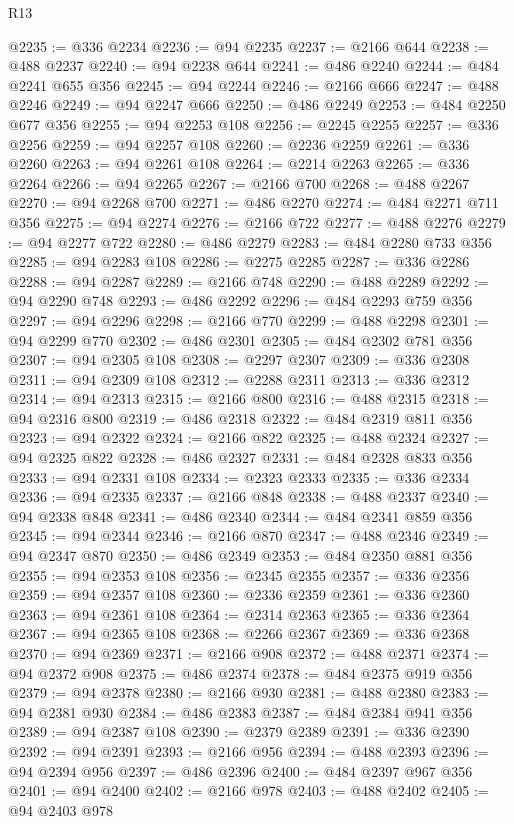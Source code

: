 \begin{lexlean}{R13}
\begin{coremodule}
@2235 := @336 @2234
@2236 := @94 @2235
@2237 := @2166 @644
@2238 := @488 @2237
@2240 := @94 @2238 @644
@2241 := @486 @2240
@2244 := @484 @2241 @655 @356
@2245 := @94 @2244
@2246 := @2166 @666
@2247 := @488 @2246
@2249 := @94 @2247 @666
@2250 := @486 @2249
@2253 := @484 @2250 @677 @356
@2255 := @94 @2253 @108
@2256 := @2245 @2255
@2257 := @336 @2256
@2259 := @94 @2257 @108
@2260 := @2236 @2259
@2261 := @336 @2260
@2263 := @94 @2261 @108
@2264 := @2214 @2263
@2265 := @336 @2264
@2266 := @94 @2265
@2267 := @2166 @700
@2268 := @488 @2267
@2270 := @94 @2268 @700
@2271 := @486 @2270
@2274 := @484 @2271 @711 @356
@2275 := @94 @2274
@2276 := @2166 @722
@2277 := @488 @2276
@2279 := @94 @2277 @722
@2280 := @486 @2279
@2283 := @484 @2280 @733 @356
@2285 := @94 @2283 @108
@2286 := @2275 @2285
@2287 := @336 @2286
@2288 := @94 @2287
@2289 := @2166 @748
@2290 := @488 @2289
@2292 := @94 @2290 @748
@2293 := @486 @2292
@2296 := @484 @2293 @759 @356
@2297 := @94 @2296
@2298 := @2166 @770
@2299 := @488 @2298
@2301 := @94 @2299 @770
@2302 := @486 @2301
@2305 := @484 @2302 @781 @356
@2307 := @94 @2305 @108
@2308 := @2297 @2307
@2309 := @336 @2308
@2311 := @94 @2309 @108
@2312 := @2288 @2311
@2313 := @336 @2312
@2314 := @94 @2313
@2315 := @2166 @800
@2316 := @488 @2315
@2318 := @94 @2316 @800
@2319 := @486 @2318
@2322 := @484 @2319 @811 @356
@2323 := @94 @2322
@2324 := @2166 @822
@2325 := @488 @2324
@2327 := @94 @2325 @822
@2328 := @486 @2327
@2331 := @484 @2328 @833 @356
@2333 := @94 @2331 @108
@2334 := @2323 @2333
@2335 := @336 @2334
@2336 := @94 @2335
@2337 := @2166 @848
@2338 := @488 @2337
@2340 := @94 @2338 @848
@2341 := @486 @2340
@2344 := @484 @2341 @859 @356
@2345 := @94 @2344
@2346 := @2166 @870
@2347 := @488 @2346
@2349 := @94 @2347 @870
@2350 := @486 @2349
@2353 := @484 @2350 @881 @356
@2355 := @94 @2353 @108
@2356 := @2345 @2355
@2357 := @336 @2356
@2359 := @94 @2357 @108
@2360 := @2336 @2359
@2361 := @336 @2360
@2363 := @94 @2361 @108
@2364 := @2314 @2363
@2365 := @336 @2364
@2367 := @94 @2365 @108
@2368 := @2266 @2367
@2369 := @336 @2368
@2370 := @94 @2369
@2371 := @2166 @908
@2372 := @488 @2371
@2374 := @94 @2372 @908
@2375 := @486 @2374
@2378 := @484 @2375 @919 @356
@2379 := @94 @2378
@2380 := @2166 @930
@2381 := @488 @2380
@2383 := @94 @2381 @930
@2384 := @486 @2383
@2387 := @484 @2384 @941 @356
@2389 := @94 @2387 @108
@2390 := @2379 @2389
@2391 := @336 @2390
@2392 := @94 @2391
@2393 := @2166 @956
@2394 := @488 @2393
@2396 := @94 @2394 @956
@2397 := @486 @2396
@2400 := @484 @2397 @967 @356
@2401 := @94 @2400
@2402 := @2166 @978
@2403 := @488 @2402
@2405 := @94 @2403 @978

\end{coremodule}
\end{lexlean}
